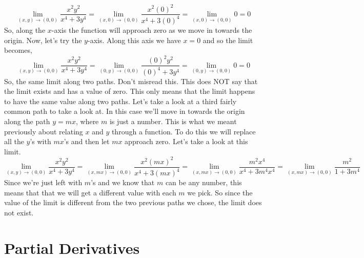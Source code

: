 \documentclass[10pt,reqno]{book}
\theoremstyle{definition}
\begin{document}
	\[ \lim_{(x,y) \to (0,0)} \frac{x^2 y^2}{x^4 + 3y^4} = \lim_{(x,0) \to (0,0)} \frac{x^2 (0)^2}{x^4 + 3(0)^4} = \lim_{(x,0) \to (0,0)} 0 = 0 \]
	So, along the $ x $-axis the function will approach zero as we move in towards the origin. Now, let's try the $ y $-axis. Along this axis we have $ x = 0 $ and so the limit becomes,
	\[ \lim_{(x,y) \to (0,0)} \frac{x^2 y^2}{x^4 + 3y^4} = \lim_{(0,y) \to (0,0)} \frac{(0)^2 y^2}{(0)^4 + 3y^4} = \lim_{(0,y) \to (0,0)} 0 = 0  \]
	So, the same limit along two paths. Don't misread this. This does NOT say that the limit exists and has a value of zero. This only means that the limit happens to have the same value along two paths. Let's take a look at a third fairly common path to take a look at. In this case we'll move in towards the origin along the path $ y =mx $, where $ m $ is just a number. This is what we meant previously about relating $ x $ and $ y $ through a function. To do this we will replace all the $ y $'s with $ mx $'s and then let $ mx $ approach zero. Let's take a look at this limit.
	\[ \lim_{(x,y) \to (0,0)} \frac{x^2 y^2}{x^4 + 3y^4} = \lim_{(x,mx) \to (0,0)} \frac{x^2 (mx)^2}{x^4 + 3(mx)^4} = \lim_{(x,mx) \to (0,0)} \frac{m^2 x^4}{x^4 + 3m^4 x^4} = \lim_{(x,mx) \to (0,0)} \frac{m^2}{1 + 3m^4}  \]
	Since we're just left with $ m $'s and we know that $ m $ can be any number, this means that that we will get a different value with each $ m $ we pick. So since the value of the limit is different from the two previous paths we chose, the limit does not exist.
	
	\section{Partial Derivatives}
	
\end{document}

